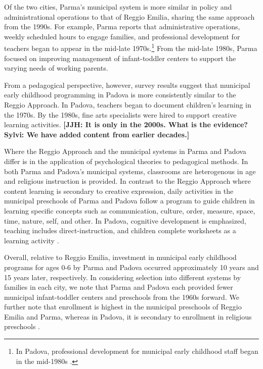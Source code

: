 Of the two cities, Parma's municipal system is more similar in policy and administrational operations to that of Reggio Emilia, sharing the same approach from the 1990s. For example, Parma reports that administrative operations, weekly scheduled hours to engage families, and professional development for teachers began to appear in the mid-late 1970s.\footnote{In Padova, professional development for municipal early childhood staff began in the mid-1980s \citep{Becchi-Ferrari_1990_Pub-Inf-Centres-Italy}.} From the mid-late 1980s, Parma focused on improving management of infant-toddler centers to support the varying needs of working parents. 

From a pedagogical perspective, however, survey results suggest that municipal early childhood programming in Padova is more consistently similar  to the Reggio Approach. In Padova, teachers began to document children's learning in the 1970s. By the 1980s, fine arts specialists were hired to support creative learning activities. 
\textbf{[JJH: It is only in the 2000s. What is the evidence? Sylvi: We have added content from earlier decades.]} 

Where the Reggio Approach and the municipal systems in Parma and Padova differ is in the application of psychological theories to pedagogical methods. In both Parma and Padova's municipal systems, classrooms are heterogenous in age and religious instruction is provided. In contrast to the Reggio Approach where content learning is secondary to creative expression, daily activities in the municipal preschools of Parma and Padova follow a program to guide children in learning specific concepts such as communication, culture, order, measure, space, time, nature, self, and other. In Padova, cognitive development is emphasized, teaching includes direct-instruction, and children complete worksheets as a learning activity \citep{CEHD_2016_Historical-Analysis}. 

Overall, relative to Reggio Emilia, investment in municipal early childhood programs for ages 0-6 by Parma and Padova occurred approximately 10 years and 15 years later, respectively. In considering selection into different systems by families in each city, we note that Parma and Padova each provided fewer municipal infant-toddler centers and preschools from the 1960s forward. We further note that enrollment is highest in the municipal preschools of Reggio Emilia and Parma, whereas in Padova, it is secondary to enrollment in religious preschools \citep{Padova-Admin-Data_1964-2011,Reggio-Admin-data_1966-2006,Reggio-Annual-Journals_1994-2011}. 

